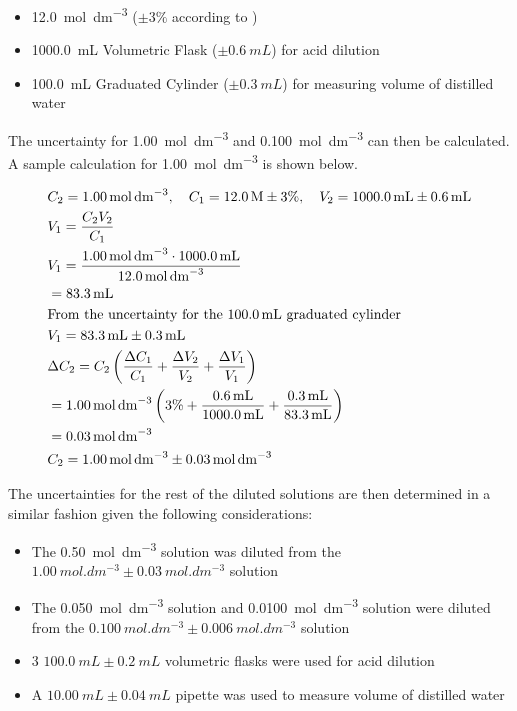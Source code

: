 \documentclass[11pt, letterpaper]{article}
\begin{document}
\begin{itemize}
    \item \SI{12.0}{mol.dm^{-3}}  (\(\pm 3\%\) according to \cite{HydrochloricAcidConcentrate})
    \item \SI{1000.0}{mL} Volumetric Flask (\(\pm \SI{0.6}{mL}\)) for acid dilution
    \item \SI{100.0}{mL} Graduated Cylinder (\(\pm \SI{0.3}{mL}\)) for measuring volume of distilled water
\end{itemize}

The uncertainty for \SI{1.00}{mol.dm^{-3}}  and \SI{0.100}{mol.dm^{-3}}
can then be calculated. A sample calculation for \SI{1.00}{mol.dm^{-3}} 
is shown below.

\begingroup
\allowdisplaybreaks
\begin{align*}
     & C_2 = \SI{1.00}{mol.dm^{-3}},\quad C_1 = \SI{12.0}{M} \pm 3\%,\quad V_2 = \SI{1000.0}{mL} \pm \SI{0.6}{mL}
    \\
     & V_1 = \frac{C_2V_2}{C_1}
    \\
     & V_1 = \frac{\SI{1.00}{mol.dm^{-3}} \cdot \SI{1000.0}{mL}}{\SI{12.0}{mol.dm^{-3}}}
    \\
     & = \SI{83.3}{mL}
    \\
     & \text{From the uncertainty for the \SI{100.0}{mL} graduated cylinder}
    \\
     & V_1 = \SI{83.3}{mL} \pm \SI{0.3}{mL}
    \\
     & \Delta C_2 = C_2 \left( \frac{\Delta C_1}{C_1} + \frac{\Delta V_2}{V_2} + \frac{\Delta V_1}{V_1} \right)
    \\
     & = \SI{1.00}{mol.dm^{-3}} \left( 3\% + \frac{\SI{0.6}{mL}}{\SI{1000.0}{mL}} + \frac{\SI{0.3}{mL}}{\SI{83.3}{mL}} \right)
    \\
     & = \SI{0.03}{mol.dm^{-3}}
    \\
     & C_2 = \SI{1.00}{mol.dm^{-3}} \pm \SI{0.03}{mol.dm^{-3}}
\end{align*}
\endgroup

The uncertainties for the rest of the diluted solutions are then determined
in a similar fashion given the following considerations:

\begin{itemize}
    \item The \SI{0.50}{mol.dm^{-3}}  solution was diluted from the \(\SI{1.00}{mol.dm^{-3}} \pm \SI{0.03}{mol.dm^{-3}}\)  solution
    \item The \SI{0.050}{mol.dm^{-3}}  solution and \SI{0.0100}{mol.dm^{-3}}  solution were diluted from the \(\SI{0.100}{mol.dm^{-3}} \pm \SI{0.006}{mol.dm^{-3}}\)  solution
    \item 3 \(\SI{100.0}{mL} \pm \SI{0.2}{mL}\) volumetric flasks were used for acid dilution
    \item A \(\SI{10.00}{mL} \pm \SI{0.04}{mL}\) pipette was used to measure volume of distilled water
\end{itemize}
\end{document}
